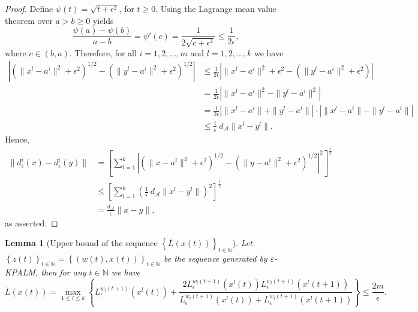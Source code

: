 \documentclass[11pt]{article}
\numberwithin{equation}{section}
\newtheorem{lemma}{Lemma}[proposition]
\def\abs#1{\left\lvert#1\right\rvert}
\begin{document}
\begin{proof}
Define $\psi(t)=\sqrt{t + {\epsilon}^2}$, for $t \geq 0$. Using the Lagrange mean value theorem over $a > b \geq 0$ yields
\begin{equation*}
	\frac{\psi(a) - \psi(b)}{a - b} = \psi'(c) = \frac{1}{2\sqrt{c + {\epsilon}^2}} \leq \frac{1}{2\epsilon},
\end{equation*}
where $c \in (b,a)$.
Therefore, for all $i=1,2, \ldots, m$ and $l=1,2, \ldots, k$ we have
\begin{equation*}
\begin{aligned}
	\abs{\left( \|x^l-a^i\|^2  + {\epsilon}^2 \right)^{1/2} - \left( \|y^l-a^i\|^2 + {\epsilon}^2 \right)^{1/2} } 
	&\leq \frac{1}{2\epsilon} \abs{ \|x^l-a^i\|^2 + {\epsilon}^2 - \left( \|y^l-a^i\|^2 + {\epsilon}^2 \right) } \\
	&= \frac{1}{2\epsilon} \abs{\|x^l-a^i\|^2 - \|y^l-a^i\|^2} \\
	&= \frac{1}{2\epsilon} \abs{\|x^l-a^i\| + \|y^l-a^i\|} \cdot \abs{\|x^l-a^i\| - \|y^l-a^i\|} \\
	&\leq \frac{1}{\epsilon} \: d_{\mathcal{A}}\|x^l-y^l\| .
\end{aligned}
\end{equation*}
Hence,
\begin{equation*}
\begin{aligned}
	\|d_{\epsilon}^i(x) - d_{\epsilon}^i(y)\| 
	&= \left[ \sum_{l=1}^{k} \abs{\left( \|x-a^i\|^2  + {\epsilon}^2 \right)^{1/2} - \left( \|y-a^i\|^2 + {\epsilon}^2 \right)^{1/2} }^2 \right]^\frac{1}{2} \\
	&\leq \left[ \sum_{l=1}^{k} \left( \frac{1}{\epsilon} \: d_{\mathcal{A}}\|x^l-y^l\| \right)^2 \right]^\frac{1}{2} \\
	&= \frac{ d_{\mathcal{A}}}{\epsilon}\|x-y\| ,
\end{aligned}
\end{equation*}
as asserted.
\end{proof}

\begin{lemma}[Upper bound of the sequence $\left\lbrace \overline{L}(x(t)) \right\rbrace_{t \in \mathbb{N}}$] \label{StateEq41}
Let $\left\lbrace z(t) \right\rbrace_{t \in \mathbb{N}} = \left\lbrace (w(t) , x(t)) \right\rbrace_{t \in \mathbb{N}}$ be the sequence generated by $\varepsilon$-KPALM, then for any $t \in \mathbb{N}$ we have
\begin{equation*}
	\overline{L}(x(t)) = \max\limits_{1 \leq l \leq k} \left\lbrace L_{\epsilon}^{w_l(t+1)}(x^l(t)) + \frac{2 L_{\epsilon}^{w_l(t+1)}(x^l(t)) L_{\epsilon}^{w_l(t+1)}(x^l(t+1))}{L_{\epsilon}^{w_l(t+1)}(x^l(t)) + L_{\epsilon}^{w_l(t+1)}(x^l(t+1))} \right\rbrace	\leq \frac{2m}{\epsilon} .
\end{equation*}
\end{lemma}
\end{document}
